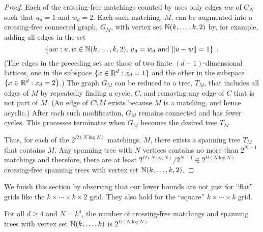 \documentclass[12pt]{article}
\newcommand{\n}{N}
\begin{document}
\begin{proof}
  Each of the crossing-free matchings counted by  uses
  only edges $uw$ of $G_\n$ such that $u_d=1$ and $w_d=2$.  Each such
  matching, $M$, can be augmented into a crossing-free connected graph,
  $G_M$, with vertex set $\mathbb{N}(k,\ldots,k,2)$ by, for example, adding all
  edges in the set
  \[
     \{ uw :\mbox{$u,w\in \mathbb{N}(k,\ldots,k,2)$, $u_d=w_d$ and $\|u-w\|=1$} \} \enspace .  
  \] 
  (The edges in the preceding set are those of two finite
  $(d-1)$-dimensional lattices, one in the subspace $\{x\in\mathbb{R}^d: x_d=1\}$
  and the other in the subspace $\{x\in\mathbb{R}^d: x_d=2\}$.)  The graph $G_M$
  can be reduced to a tree, $T_M$, that includes all edges
  of $M$ by repeatedly finding a cycle, $C$, and removing any edge of $C$
  that is not part of $M$.  (An edge of $C\setminus M$ exists because $M$
  is a matching, and hence acyclic.)  After each such modification, $G_M$
  remains connected and has fewer cycles.  This processes terminates
  when $G_M$ becomes the desired tree $T_M$.

  Thus, for each of the $2^{\Omega(\n\log\n)}$ matchings, $M$, there
  exists a spanning tree $T_M$ that contains $M$.  Any spanning tree
  with $\n$ vertices contains no more than $2^{\n-1}$ matchings and therefore,
  there are at least $2^{\Omega(\n\log\n)}/2^{\n-1}\in 2^{\Omega(\n\log\n)}$
  crossing-free spanning trees with vertex set $\mathbb{N}(k,\ldots,k,2)$.
\end{proof}

We finish this section by observing that our lower bounds are not
just for ``flat'' grids like the $k\times\cdots\times k\times 2$ grid.
They also hold for the ``square'' $k\times\cdots\times k$ grid.

\begin{cor}
  For all $d\ge 4$ and $\n=k^d$, the number of crossing-free matchings
  and spanning trees with vertex set $\mathbb{N}(k,\ldots,k)$ is
  $2^{\Omega(\n\log \n)}$
\end{cor}
\end{document}
